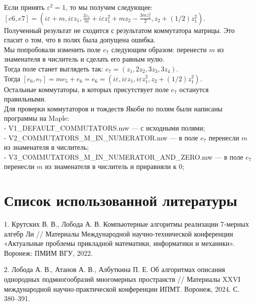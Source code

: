 \documentclass[12pt]{article}
\begin{document}
Если принять $\varepsilon^2 = 1$, то мы получим следующее: \\

$[e6, e7] = \left(i \varepsilon + m, i \varepsilon z_1, \frac{3 z_1}{m} + i \varepsilon z_1^2 + m z_2 - \frac{3m z_1^2}{2}, z_2 + (1/2)z_1^2 \right)$. \\

Полученный результат не сходится с результатом коммутатора матрицы. Это гласит о том, что в полях была допущена ошибка. \\

Мы попробовали изменить поле $e_7$ следующим образом: перенести $m$ из знаменателя в числитель и сделать его равным нулю. \\

Тогда поле станет выглядеть так: $e_7 = (z_1, 2z_2, 3z_3, 3z_4).$ \\

Тогда $[e_6, e_7] = me_5 + e_6 = e_6 = \left(i \varepsilon, i \varepsilon z_1, i \varepsilon z_1^2, z_2 + (1/2)z_1^2 \right).$ \\

Остальные коммутаторы, в которых присутствует поле $e_7$ останутся правильными. \\

Для проверки коммутаторов и тождеств Якоби по полям были написаны программы на Maple: \\

- V1_DEFAULT_COMMUTATORS.mw — с исходными полями; \\

- V2_COMMUTATORS_M_IN_NUMERATOR.mw — в поле $e_7$ перенесли $m$ из знаменателя в числитель; \\

- V3_COMMUTATORS_M_IN_NUMERATOR_AND_ZERO.mw — в поле $e_7$ перенесли $m$ из знаменателя в числитель и приравняли к 0;

\pagebreak
\section{Список использованной литературы}

1. Крутских В. В., Лобода А. В. Компьютерные алгоритмы реализации 7-мерных алгебр Ли // Материалы Международной научно-технической конференции «Актуальные проблемы прикладной математики, информатики и механики». Воронеж: ПМИМ ВГУ, 2022.

2. Лобода А. В., Атанов А. В., Албуткина П. Е. Об алгоритмах описания однородных подмногообразий многомерных пространств // Материалы XXVI международной научно-практической конференции ИПМТ. Воронеж, 2024. С. 380–391.
\end{document}
